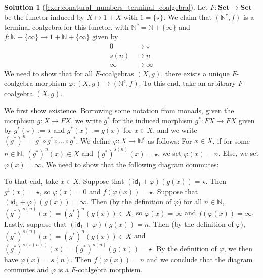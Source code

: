 \documentclass[a4paper,11pt, oneside,titlepage=false]{scrbook}
\theoremstyle{plain}
\theoremstyle{definition}
\newtheorem{solution}[thm]{Solution}
\newcommand{\cfont}[1]{\ensuremath{\mathsf{#1}}}
\newcommand{\Catb}[1]{\mathbf{#1}}
\newcommand{\SET}{\Catb{Set}}
\newcommand{\Id}[1][]{\cfont{id}_{#1}}
\begin{document}
\begin{solution}[\cref{exer:conatural_numbers_terminal_coalgebra}] \label{sol:conatural_numbers_terminal_coalgebra}
	Let $ F: \SET \to \SET $ be the functor induced by $ X \mapsto 1 + X $ with $ 1 = \{ \star \} $.
	We claim that $ (\mathbb N^c, f) $ is a terminal coalgebra for this functor, with $ \mathbb N^c = \mathbb N + \{ \infty \} $ and $ f: \mathbb N + \{ \infty \} \to 1 + \mathbb N + \{ \infty \} $ given by
	\begin{align*}
		0 &\mapsto \star\\
		s(n) &\mapsto n\\
		\infty &\mapsto \infty
	\end{align*}
	We need to show that for all $ F $-coalgebras $ (X, g) $, there exists a unique $ F $-coalgebra morphism $ \varphi: (X, g) \to (\mathbb N^c , f) $. To this end, take an arbitrary $ F $-coalgebra $ (X, g) $.

	We first show existence. Borrowing some notation from monads, given the morphism $ g: X \to F X $, we write $ g^* $ for the induced morphism $ g^*: F X \to F X $ given by $g^{*}(\star) := \star$ and $g^{*}(x) := g(x)$ for $x \in X$, and we write $ (g^*)^n = g^* \circ g^* \circ \dots \circ g^* $. We define $ \varphi: X \to \mathbb N^c $ as follows: For $ x \in X $, if for some $ n \in \mathbb N $, $ (g^*)^n(x) \in X $ and $ (g^*)^{s(n)}(x) = \star $, we set $ \varphi(x) = n $. Else, we set $ \varphi(x) = \infty $. We need to show that the following diagram commutes:
	\begin{center}
	\end{center}
	To that end, take $ x \in X $. Suppose that $ (\Id[1] + \varphi)(g(x)) = \star $. Then $ g^1(x) = \star $, so $ \varphi(x) = 0 $ and $ f(\varphi(x)) = \star $. Suppose that $ (\Id[1] + \varphi)(g(x)) = \infty $. Then (by the definition of $ \varphi $) for all $ n \in \mathbb N $, $ (g^*)^{s(n)}(x) = (g^*)^n(g(x)) \in X $, so $ \varphi(x) = \infty $ and $ f(\varphi(x)) = \infty $. Lastly, suppose that $ (\Id[1] + \varphi)(g(x)) = n $. Then (by the definition of $ \varphi $), $ (g^*)^{s(n)}(x) = (g^*)^{n}(g(x)) \in X $ and $ (g^*)^{s(s(n))}(x) = (g^*)^{s(n)}(g(x)) = \star $. By the definition of $ \varphi $, we then have $ \varphi(x) = s(n) $. Then $ f(\varphi(x)) = n $ and we conclude that the diagram commutes and $ \varphi $ is a $ F $-coalgebra morphism.


\end{solution}
\end{document}
